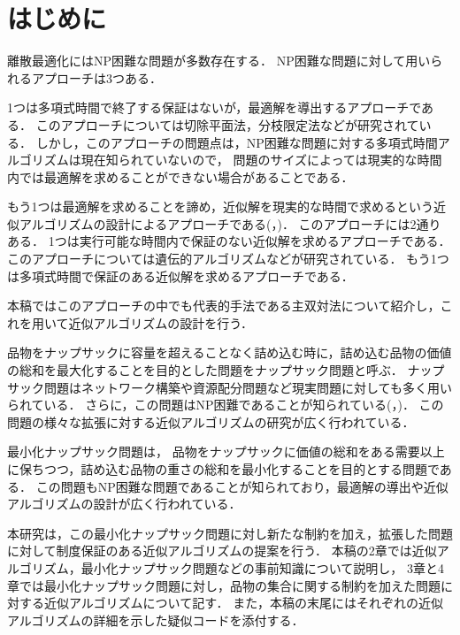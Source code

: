 \documentclass[11pt,dvipdfmx]{jarticle}
\numberwithin{equation}{section}
\begin{document}
\section{はじめに}
    離散最適化にはNP困難な問題が多数存在する．
    NP困難な問題に対して用いられるアプローチは3つある．\par
    1つは多項式時間で終了する保証はないが，最適解を導出するアプローチである．
    このアプローチについては切除平面法\cite{kp_np}，分枝限定法\cite{kp}などが研究されている．
    しかし，このアプローチの問題点は，NP困難な問題に対する多項式時間アルゴリズムは現在知られていないので，
    問題のサイズによっては現実的な時間内では最適解を求めることができない場合があることである．\par
    もう1つは最適解を求めることを諦め，近似解を現実的な時間で求めるという近似アルゴリズムの設計によるアプローチである(\cite{apx_des}，\cite{apx_al})．
    このアプローチには2通りある．
    1つは実行可能な時間内で保証のない近似解を求めるアプローチである．このアプローチについては遺伝的アルゴリズムなどが研究されている．
    もう1つは多項式時間で保証のある近似解を求めるアプローチである．\par
    本稿ではこのアプローチの中でも代表的手法である主双対法について紹介し，これを用いて近似アルゴリズムの設計を行う．\par
    品物をナップサックに容量を超えることなく詰め込む時に，詰め込む品物の価値の総和を最大化することを目的とした問題をナップサック問題と呼ぶ\cite{kp}．
    ナップサック問題はネットワーク構築\cite{kp_ex1}や資源配分問題\cite{kp_ex2}など現実問題に対しても多く用いられている．
    さらに，この問題はNP困難であることが知られている(\cite{kp_np}，\cite{np_c})．
    この問題の様々な拡張に対する近似アルゴリズムの研究が広く行われている．\par
    最小化ナップサック問題は，
    品物をナップサックに価値の総和をある需要以上に保ちつつ，詰め込む品物の重さの総和を最小化することを目的とする問題である\cite{apx_des}．
    この問題もNP困難な問題であることが知られており，最適解の導出や近似アルゴリズムの設計が広く行われている．\par
    本研究は，この最小化ナップサック問題に対し新たな制約を加え，拡張した問題に対して制度保証のある近似アルゴリズムの提案を行う．
    本稿の2章では近似アルゴリズム，最小化ナップサック問題などの事前知識について説明し，
    3章と4章では最小化ナップサック問題に対し，品物の集合に関する制約を加えた問題に対する近似アルゴリズムについて記す．
    また，本稿の末尾にはそれぞれの近似アルゴリズムの詳細を示した疑似コードを添付する．

\newpage
\end{document}
